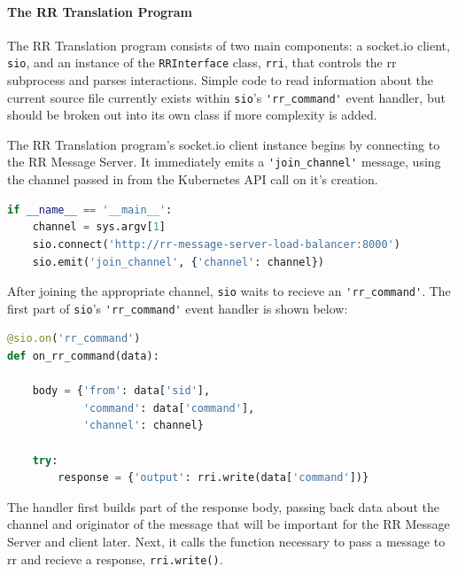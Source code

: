 \documentclass[12pt]{article}
\begin{document}
\paragraph{The RR Translation Program} \label{joiningchannel}

The RR Translation program consists of two main components: a socket.io
client, \lstinline{sio}, and an instance of the
\lstinline{RRInterface} class, \lstinline{rri}, that controls the rr
subprocess and parses interactions.  Simple code to read information
about the current source file currently exists within
\lstinline{sio}'s \lstinline{'rr_command'} event handler, but should
be broken out into its own class if more complexity is added.
\par

The RR Translation program's socket.io client instance begins by
connecting to the RR Message Server.  It immediately emits a
\lstinline{'join_channel'} message, using the channel passed in from
the Kubernetes API call on it's creation. \\

\begin{lstlisting}[language=Python,basicstyle=\linespread{0.5}\ttfamily\small,caption={RR Translation Main},captionpos=b]
if __name__ == '__main__':
    channel = sys.argv[1]
    sio.connect('http://rr-message-server-load-balancer:8000')
    sio.emit('join_channel', {'channel': channel})
\end{lstlisting}

After joining the appropriate channel, \lstinline{sio} waits to
recieve an \lstinline{'rr_command'}.  The first part of
\lstinline{sio}'s \lstinline{'rr_command'} event handler is shown below:\\

\begin{lstlisting}[language=Python,basicstyle=\linespread{0.5}\ttfamily\small,caption={RR Command Event Handler},captionpos=b]
@sio.on('rr_command')
def on_rr_command(data):

    body = {'from': data['sid'],
            'command': data['command'],
            'channel': channel}
    
    try:
        response = {'output': rri.write(data['command'])}
\end{lstlisting}

The handler first builds part of the response body, passing back data
about the channel and originator of the message that will be important
for the RR Message Server and client later.  Next, it calls the
function necessary to pass a message to rr and recieve a response,
\lstinline{rri.write()}.
\par
\end{document}
